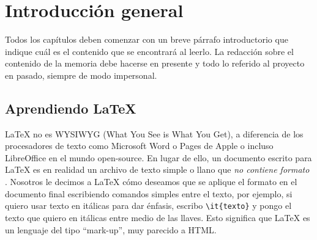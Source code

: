 
\chapter{Introducción general} %

\label{Chapter1} %
\label{IntroGeneral}

Todos los capítulos deben comenzar con un breve párrafo introductorio que
indique cuál es el contenido que se encontrará al leerlo. La redacción sobre el
contenido de la memoria debe hacerse en presente y todo lo referido al proyecto
en pasado, siempre de modo impersonal.


\newcommand{\keyword}[1]{\textbf{#1}}
\newcommand{\tabhead}[1]{\textbf{#1}}
\newcommand{\code}[1]{\texttt{#1}}
\newcommand{\file}[1]{\texttt{\bfseries#1}}
\newcommand{\option}[1]{\texttt{\itshape#1}}
\newcommand{\grados}{$^{\circ}$}



\section{Aprendiendo \LaTeX{}}

\LaTeX{} no es \textsc{WYSIWYG} (What You See is What You Get), a diferencia de los procesadores de texto como Microsoft Word o Pages de Apple o incluso LibreOffice en el mundo open-source. En lugar de ello, un documento escrito para \LaTeX{} es en realidad un archivo de texto simple o llano que \emph{no contiene formato} . Nosotros le decimos a \LaTeX{} cómo deseamos que se aplique el formato en el documento final escribiendo comandos simples entre el texto, por ejemplo, si quiero usar texto en itálicas para dar énfasis, escribo \verb|\it{texto}| y pongo el texto que quiero en itálicas entre medio de las llaves. Esto significa que \LaTeX{} es un lenguaje del tipo \enquote{mark-up}, muy parecido a HTML.

